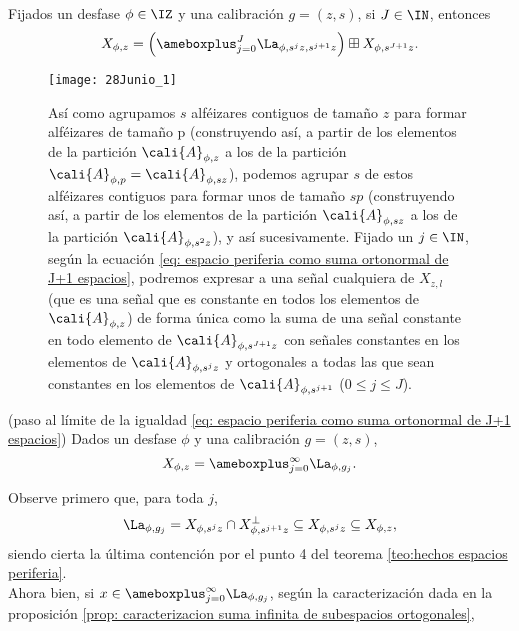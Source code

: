 \begin{obs} 
Fijados 
un desfase $\phi \in \IZ$ y
una calibración
$g=(z,s)$,
si $J \in \IN$, entonces
\begin{equation} 
\label{eq: espacio periferia como suma ortonormal de J+1 espacios}
X_{\phi, z}= \left( \ameboxplus_{j=0}^{J}\La_{\phi, s^{j}z, s^{j+1}z} \right) \boxplus
X_{\phi, s^{J+1}z}.
\end{equation}
\end{obs}

\begin{figure}[H]
	\centering
	\texttt{[image: 28Junio\_1]}
	\caption{ Así como agrupamos $s$ alféizares contiguos de tamaño $z$ para formar alféizares de tamaño p (construyendo así, a partir de los elementos de la partición 
$\cali{A}_{\phi, z}$ a los de la partición 
$\cali{A}_{\phi, p}=\cali{A}_{\phi, sz}$), 
podemos agrupar $s$ de estos alféizares
contiguos para formar unos de tamaño $sp$ 
(construyendo así, a partir de los elementos de la partición 
$\cali{A}_{\phi, sz}$ a los de la partición 
$\cali{A}_{\phi, s^{2}z}$), y así sucesivamente. 
Fijado un $j \in \IN$,
según la ecuación
\ref{eq: espacio periferia como suma ortonormal de J+1 espacios}, 
podremos expresar a una señal cualquiera de $X_{z,l}$ 
(que es una señal que es constante en todos los elementos de 
$\cali{A}_{\phi, z}$) 
de forma única como la suma de una señal 
constante en todo elemento de $\cali{A}_{\phi, s^{J+1}z}$
con señales constantes en los elementos de $\cali{A}_{\phi, s^{j}z}$ y ortogonales a todas las que sean constantes en los elementos de $\cali{A}_{\phi, s^{j+1}}$ ($0 \leq j \leq J$).}
\end{figure}


\begin{teo} 
\label{teo: paso al limite, suma ortogonal}
(paso al límite de 
la igualdad
\eqref{eq: espacio periferia como suma ortonormal de J+1 espacios})
Dados un desfase $\phi$ y una calibración $g=(z,s)$,
\[
X_{\phi,z} = \ameboxplus_{j = 0}^{\infty} \La_{\phi, g_{j}}.
\]
\end{teo}
\demostracion
Observe primero que, para toda $j$,
\begin{equation} \label{ec2: 16 Agosto}
\La_{\phi,g_{j}} = X_{\phi,s^{j}z} \cap
X^{\perp}_{\phi,s^{j+1}z} \subseteq X_{\phi,s^{j}z} \subseteq X_{\phi,z},
\end{equation}
\noindent
siendo cierta la última contención por el punto 4 del teorema 
\ref{teo:hechos espacios periferia}.\\
Ahora bien, si 
$x \in \ameboxplus_{j = 0}^{\infty} \La_{\phi,g_{j}}$,
según la caracterización dada en la proposición
\ref{prop: caracterizacion suma infinita de subespacios ortogonales},

